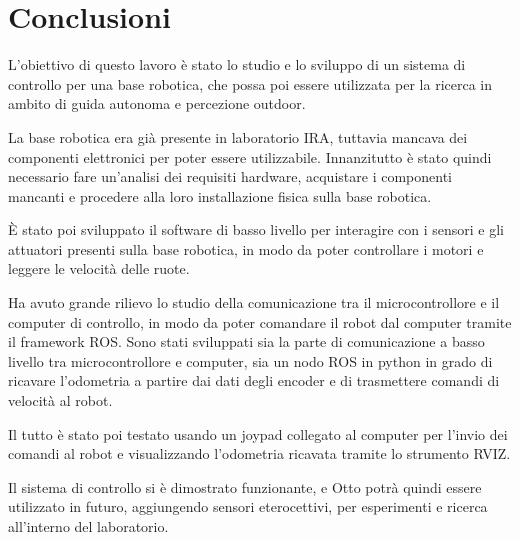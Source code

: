 \chapter{Conclusioni}

L’obiettivo di questo lavoro è stato lo studio e lo sviluppo di un sistema di controllo per una base robotica, che possa poi essere utilizzata per la ricerca in ambito di guida autonoma e percezione outdoor.

La base robotica era già presente in laboratorio IRA, tuttavia mancava dei componenti elettronici per poter essere utilizzabile.
Innanzitutto è stato quindi necessario fare un'analisi dei requisiti hardware, acquistare i componenti mancanti e procedere alla loro installazione fisica sulla base robotica.

È stato poi sviluppato il software di basso livello per interagire con i sensori e gli attuatori presenti sulla base robotica, in modo da poter controllare i motori e leggere le velocità delle ruote.

Ha avuto grande rilievo lo studio della comunicazione tra il microcontrollore e il computer di controllo, in modo da poter comandare il robot dal computer tramite il framework ROS. Sono stati sviluppati sia la parte di comunicazione a basso livello tra microcontrollore e computer, sia un nodo ROS in python in grado di ricavare l'odometria a partire dai dati degli encoder e di trasmettere comandi di velocità al robot.

Il tutto è stato poi testato usando un joypad collegato al computer per l'invio dei comandi al robot e visualizzando l'odometria ricavata tramite lo strumento RVIZ. 

Il sistema di controllo si è dimostrato funzionante, e Otto potrà quindi essere utilizzato in futuro, aggiungendo sensori eterocettivi, per esperimenti e ricerca all'interno del laboratorio.


